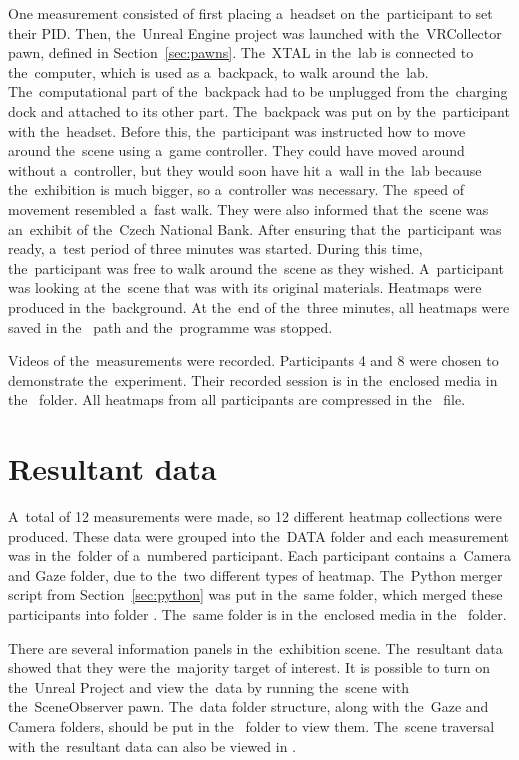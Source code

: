 One measurement consisted of first placing a~headset on the~participant to set their PID. Then, the~Unreal Engine project was launched with the~VRCollector pawn, defined in Section~\ref{sec:pawns}. The~XTAL in the~lab is connected to the~computer, which is used as a~backpack, to walk around the~lab. The~computational part of the~backpack had to be unplugged from the~charging dock and attached to its other part. The~backpack was put on by the~participant with the~headset. Before this, the~participant was instructed how to move around the~scene using a~game controller. They could have moved around without a~controller, but they would soon have hit a~wall in the~lab because the~exhibition is much bigger, so a~controller was necessary. The~speed of movement resembled a~fast walk. They were also informed that the~scene was an~exhibit of the~Czech National Bank. After ensuring that the~participant was ready, a~test period of three minutes was started. During this time, the~participant was free to walk around the~scene as they wished. A~participant was looking at the~scene that was with its original materials. Heatmaps were produced in the~background. At the~end of the~three minutes, all heatmaps were saved in the~ path and the~programme was stopped.

Videos of the~measurements were recorded. Participants 4 and 8 were chosen to demonstrate the~experiment. Their recorded session is in the~enclosed media in the~ folder. All heatmaps from all participants are compressed in the~ file.


\section{Resultant data}

A~total of 12 measurements were made, so 12 different heatmap collections were produced. These data were grouped into the~DATA folder and each measurement was in the~folder of a~numbered participant. Each participant contains a~Camera and Gaze folder, due to the~two different types of heatmap. The~Python merger script from Section~\ref{sec:python} was put in the~same folder, which merged these participants into folder . The~same folder is in the~enclosed media in the~ folder.

There are several information panels in the~exhibition scene. The~resultant data showed that they were the~majority target of interest. It is possible to turn on the~Unreal Project and view the~data by running the~scene with the~SceneObserver pawn. The~data folder structure, along with the~Gaze and Camera folders, should be put in the~ folder to view them. The~scene traversal with the~resultant data can also be viewed in .

